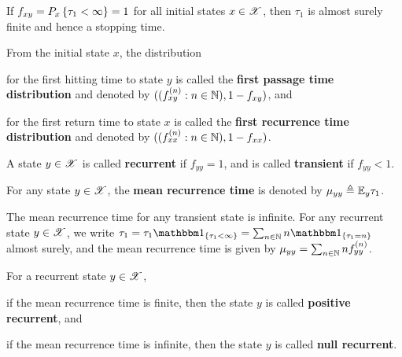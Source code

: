 \documentclass[letterpaper,10pt,english]{article}
\begin{document}
\begin{rem}
If $f_{xy} = P_x\left\{\tau_1 < \infty\right\} = 1$ for all initial states $x \in \mathscr{X}$, 
then $\tau_1$ is almost surely finite and hence a stopping time.
\end{rem}
\begin{defn} 
From the initial state $x$, the distribution 
\begin{compactenum}[(i)]
\item for the first hitting time to state $y$ is called the \textbf{first passage time distribution} and denoted by $((f_{xy}^{(n)}: n \in \mathbb{N}), 1 - f_{xy})$, and 
\item for the first return time to state $x$ is called the \textbf{first recurrence time distribution} and denoted by $((f_{xx}^{(n)}: n \in \mathbb{N}),1 - f_{xx})$. 
\end{compactenum}
\end{defn}
\begin{defn}
A state $y\in\mathscr{X}$ is called \textbf{recurrent} if $f_{yy} = 1$, and is called \textbf{transient} if $f_{yy} < 1$. 
\end{defn}
\begin{defn}
For any state $y \in \mathscr{X}$, the \textbf{mean recurrence time} is denoted by $\mu_{yy} \triangleq \mathbb{E}_y\tau_1$. 
\end{defn}
\begin{rem}
The mean recurrence time for any transient state is infinite. 
For any recurrent state $y \in \mathscr{X}$, we write $\tau_1 = \tau_1\SetIn{\tau_1 < \infty} = \sum_{n \in \N}n\SetIn{\tau_1=n}$ almost surely, 
and the mean recurrence time is given by $\mu_{yy} = \sum_{n \in \mathbb{N}}nf^{(n)}_{yy}$.   
\end{rem}
\begin{defn} 
For a recurrent state $y \in \mathscr{X}$, 
\begin{compactenum}[(i)]
\item if the mean recurrence time is finite, then the state $y$ is called \textbf{positive recurrent}, and  
\item if the mean recurrence time is infinite, then the state $y$ is called \textbf{null recurrent}.
\end{compactenum}
\end{defn}

\end{document}

